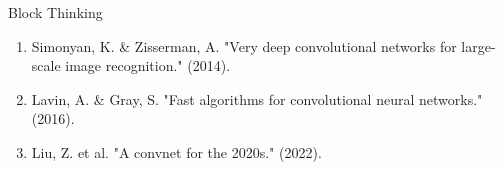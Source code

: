 \documentclass[aspectratio=169,xcolor=dvipsnames,svgnames,x11names,fleqn]{beamer}
\begin{document}
\begin{frame}[fragile]{Block Thinking}
\vspace{5pt}
\begin{tcolorbox}[colback=gray!5, colframe=citeGray, title=\scriptsize Three important papers in that area:, fonttitle=\bfseries]
    \tiny
    \begin{enumerate}
        \item Simonyan, K. \& Zisserman, A. "Very deep convolutional networks for large-scale image recognition." (2014).
        \item Lavin, A. \& Gray, S. "Fast algorithms for convolutional neural networks." (2016).
        \item Liu, Z. et al. "A convnet for the 2020s." (2022).
    \end{enumerate}
\end{tcolorbox}

\end{frame}
\end{document}
